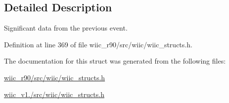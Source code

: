 \subsection{Detailed Description}
Significant data from the previous event. 

Definition at line 369 of file wiic\-\_\-r90/src/wiic/wiic\-\_\-structs.\-h.



The documentation for this struct was generated from the following files\-:\begin{DoxyCompactItemize}
\item 
\hyperlink{wiic__r90_2src_2wiic_2wiic__structs_8h}{wiic\-\_\-r90/src/wiic/wiic\-\_\-structs.\-h}\item 
\hyperlink{wiic__v1_81_2src_2wiic_2wiic__structs_8h}{wiic\-\_\-v1./src/wiic/wiic\-\_\-structs.\-h}\end{DoxyCompactItemize}
